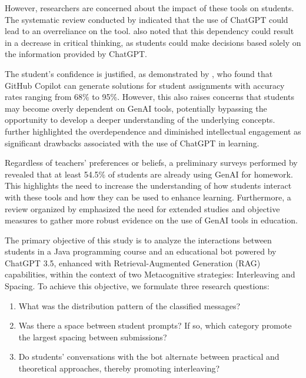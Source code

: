 \documentclass[a4paper,twoside]{article}
\begin{document}
However, researchers are concerned about the impact of these tools on
students. The systematic review conducted by \cite{Murillo23} indicated that
the use of ChatGPT could lead to an overreliance on the tool. \cite{chan23} also noted
that this dependency could result in a decrease in critical thinking, as students
could make decisions based solely on the information provided by ChatGPT.

The student’s confidence is justified, as demonstrated by \cite{Puryear22}, who
found that GitHub Copilot can generate solutions for student assignments with
accuracy rates ranging from 68\% to 95\%. However, this also raises concerns
that students may become overly dependent on GenAI tools, potentially bypassing
the opportunity to develop a deeper understanding of the underlying concepts.
\cite{cai23} further highlighted the overdependence and diminished intellectual
engagement as significant drawbacks associated with the use of ChatGPT in
learning.

Regardless of teachers' preferences or beliefs, a preliminary surveys performed
by \cite{Dickey24} revealed that at least 54.5\% of students are already using
GenAI for homework. This highlights the need to increase the understanding of
how students interact with these tools and how they can be used to
enhance learning. Furthermore, a review organized by \cite{Lo24} emphasized the
need for extended studies and objective measures to gather more robust
evidence on the use of GenAI tools in education.

The primary objective of this study is to analyze the interactions between
students in a Java programming course and an educational bot powered by
ChatGPT 3.5, enhanced with Retrieval-Augmented Generation (RAG) capabilities,
within the context of two Metacognitive strategies: Interleaving and Spacing.
To achieve this objective, we formulate three research questions:

\begin{enumerate}
  \item What was the distribution pattern of the classified messages?
  \item Was there a space between student prompts? If so, which category promote the largest spacing between submissions?
  \item Do students' conversations with the bot alternate between practical and theoretical approaches, thereby promoting interleaving?
\end{enumerate}

\end{document}
